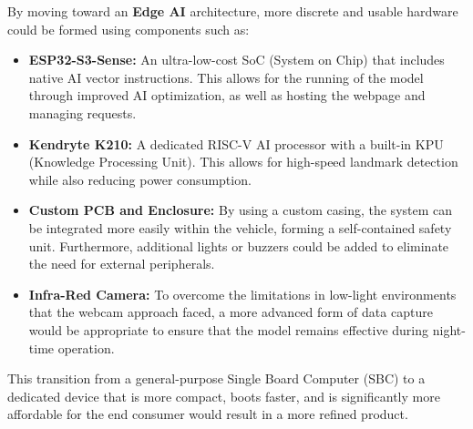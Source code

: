 By moving toward an \textbf{Edge AI} architecture, more discrete and usable hardware could be formed using components such as:
\begin{itemize}
    \item \textbf{ESP32-S3-Sense:} An ultra-low-cost SoC (System on Chip) that includes native AI vector instructions. This allows
    for the running of the model through improved AI optimization, as well as hosting the webpage and managing requests.
    \item \textbf{Kendryte K210:} A dedicated RISC-V AI processor with a built-in KPU (Knowledge Processing Unit). This allows for
    high-speed landmark detection while also reducing power consumption.
    \item \textbf{Custom PCB and Enclosure:} By using a custom casing, the system can be integrated more easily within the vehicle,
    forming a self-contained safety unit. Furthermore, additional lights or buzzers could be added to eliminate the need for external
    peripherals.
    \item \textbf{Infra-Red Camera:} To overcome the limitations in low-light environments that the webcam approach faced, a more
    advanced form of data capture would be appropriate to ensure that the model remains effective during night-time operation.
\end{itemize}
This transition from a general-purpose Single Board Computer (SBC) to a dedicated device that is more compact, boots faster, and
is significantly more affordable for the end consumer would result in a more refined product.
